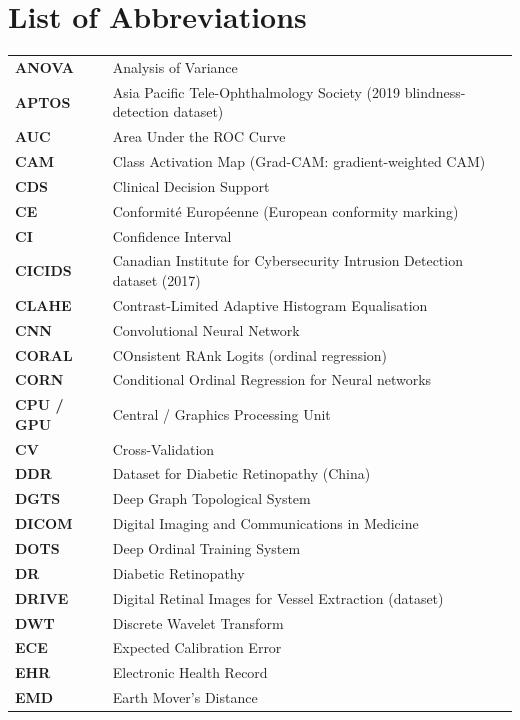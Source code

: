 \chapter*{List of Abbreviations}

\begingroup
\small{}
\setlength{\tabcolsep}{8pt}
\renewcommand{\arraystretch}{1.12}
\begin{longtable}{@{}>{\bfseries}l P{12.1cm}@{}}
ANOVA & Analysis of Variance \\
APTOS & Asia Pacific Tele-Ophthalmology Society (2019 blindness-detection dataset) \\
AUC & Area Under the ROC Curve \\
CAM & Class Activation Map (Grad-CAM: gradient-weighted CAM) \\
CDS & Clinical Decision Support \\
CE & Conformit\'e Europ\'eenne (European conformity marking) \\
CI & Confidence Interval \\
CICIDS & Canadian Institute for Cybersecurity Intrusion Detection dataset (2017) \\
CLAHE & Contrast-Limited Adaptive Histogram Equalisation \\
CNN & Convolutional Neural Network \\
CORAL & COnsistent RAnk Logits (ordinal regression) \\
CORN & Conditional Ordinal Regression for Neural networks \\
CPU / GPU & Central / Graphics Processing Unit \\
CV & Cross-Validation \\
DDR & Dataset for Diabetic Retinopathy (China) \\
DGTS & Deep Graph Topological System \\
DICOM & Digital Imaging and Communications in Medicine \\
DOTS & Deep Ordinal Training System \\
DR & Diabetic Retinopathy \\
DRIVE & Digital Retinal Images for Vessel Extraction (dataset) \\
DWT & Discrete Wavelet Transform \\
ECE & Expected Calibration Error \\
EHR & Electronic Health Record \\
EMD & Earth Mover's Distance \\

\end{longtable}

